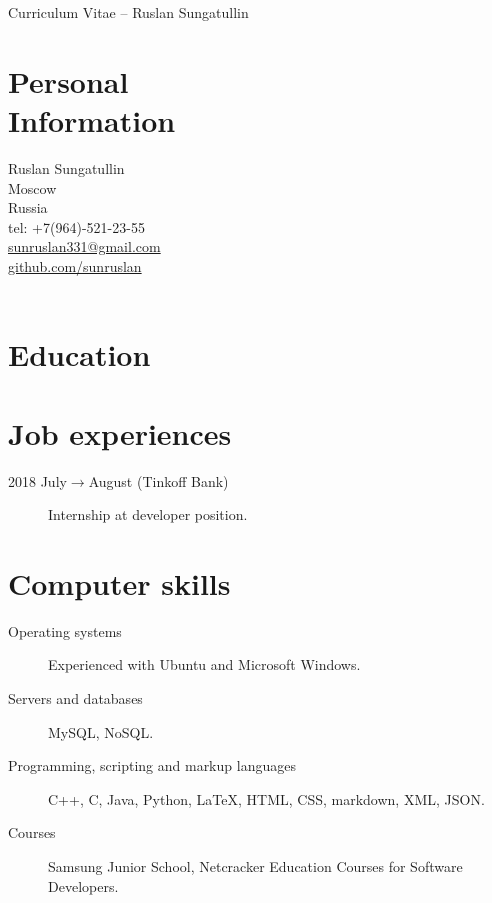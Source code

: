 \documentclass[margin,line,a4paper]{resume}
\begin{document}
{\sc \Large Curriculum Vitae -- Ruslan Sungatullin}
\begin{resume}
    \vspace{0.5cm}
    
    


\section{\mysidestyle Personal\\Information}%
    Ruslan Sungatullin \\
    Moscow \\ 
    Russia \\ 
    tel: +7(964)-521-23-55 \\
    \href{mailto:sunruslan331@gmail.com}{sunruslan331@gmail.com} \\
    \href{https://github.com/sunruslan}{github.com/sunruslan}\\ \\   

\section{\mysidestyle Education} 
    
    

\section{\mysidestyle Job experiences}\vspace{1mm}
\begin{description}
    \item[2018 July$\rightarrow$August (Tinkoff Bank)] Internship at developer position.
\end{description}


\section{\mysidestyle Computer skills}\vspace{1mm}
\begin{description}
    \item[Operating systems] Experienced with Ubuntu and Microsoft Windows.
    \item[Servers and databases] MySQL, NoSQL.
    \item[Programming, scripting and markup languages] C++, C, Java, Python, \LaTeX, HTML, CSS, markdown, XML, JSON.
    \item[Courses] Samsung Junior School, Netcracker Education Courses for Software Developers.  
\end{description}


\end{resume}
\end{document}
